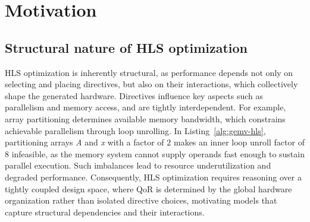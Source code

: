 \section{Motivation}
\label{sec:motivation}

\subsection{Structural nature of HLS optimization}
\label{subsec:hls-structural}

HLS optimization is inherently structural, as performance depends not only on selecting and placing directives, but also on their interactions, which collectively shape the generated hardware. Directives influence key aspects such as parallelism and memory access, and are tightly interdependent. For example, array partitioning determines available memory bandwidth, which constrains achievable parallelism through loop unrolling. In Listing~\ref{alg:gemv-hls}, partitioning arrays \textit{A} and \textit{x} with a factor of $2$ makes an inner loop unroll factor of $8$ infeasible, as the memory system cannot supply operands fast enough to sustain parallel execution. Such imbalances lead to resource underutilization and degraded performance. Consequently, HLS optimization requires reasoning over a tightly coupled design space, where QoR is determined by the global hardware organization rather than isolated directive choices, motivating models that capture structural dependencies and their interactions.

